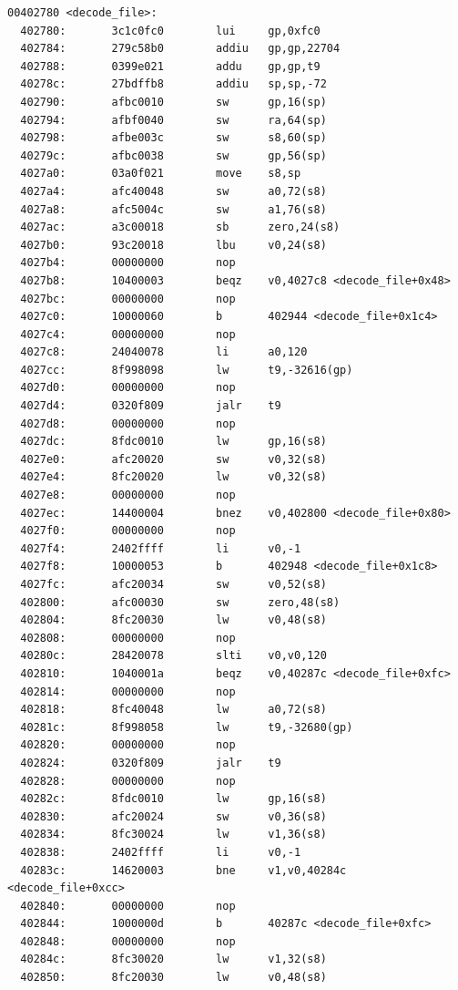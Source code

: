 \documentclass[11pt]{article}
\begin{document}
\begin{verbatim}
00402780 <decode_file>:
  402780:       3c1c0fc0        lui     gp,0xfc0
  402784:       279c58b0        addiu   gp,gp,22704
  402788:       0399e021        addu    gp,gp,t9
  40278c:       27bdffb8        addiu   sp,sp,-72
  402790:       afbc0010        sw      gp,16(sp)
  402794:       afbf0040        sw      ra,64(sp)
  402798:       afbe003c        sw      s8,60(sp)
  40279c:       afbc0038        sw      gp,56(sp)
  4027a0:       03a0f021        move    s8,sp
  4027a4:       afc40048        sw      a0,72(s8)
  4027a8:       afc5004c        sw      a1,76(s8)
  4027ac:       a3c00018        sb      zero,24(s8)
  4027b0:       93c20018        lbu     v0,24(s8)
  4027b4:       00000000        nop
  4027b8:       10400003        beqz    v0,4027c8 <decode_file+0x48>
  4027bc:       00000000        nop
  4027c0:       10000060        b       402944 <decode_file+0x1c4>
  4027c4:       00000000        nop
  4027c8:       24040078        li      a0,120
  4027cc:       8f998098        lw      t9,-32616(gp)
  4027d0:       00000000        nop
  4027d4:       0320f809        jalr    t9
  4027d8:       00000000        nop
  4027dc:       8fdc0010        lw      gp,16(s8)
  4027e0:       afc20020        sw      v0,32(s8)
  4027e4:       8fc20020        lw      v0,32(s8)
  4027e8:       00000000        nop
  4027ec:       14400004        bnez    v0,402800 <decode_file+0x80>
  4027f0:       00000000        nop
  4027f4:       2402ffff        li      v0,-1
  4027f8:       10000053        b       402948 <decode_file+0x1c8>
  4027fc:       afc20034        sw      v0,52(s8)
  402800:       afc00030        sw      zero,48(s8)
  402804:       8fc20030        lw      v0,48(s8)
  402808:       00000000        nop
  40280c:       28420078        slti    v0,v0,120
  402810:       1040001a        beqz    v0,40287c <decode_file+0xfc>
  402814:       00000000        nop
  402818:       8fc40048        lw      a0,72(s8)
  40281c:       8f998058        lw      t9,-32680(gp)
  402820:       00000000        nop
  402824:       0320f809        jalr    t9
  402828:       00000000        nop
  40282c:       8fdc0010        lw      gp,16(s8)
  402830:       afc20024        sw      v0,36(s8)
  402834:       8fc30024        lw      v1,36(s8)
  402838:       2402ffff        li      v0,-1
  40283c:       14620003        bne     v1,v0,40284c <decode_file+0xcc>
  402840:       00000000        nop
  402844:       1000000d        b       40287c <decode_file+0xfc>
  402848:       00000000        nop
  40284c:       8fc30020        lw      v1,32(s8)
  402850:       8fc20030        lw      v0,48(s8)

\end{verbatim}
\end{document}

